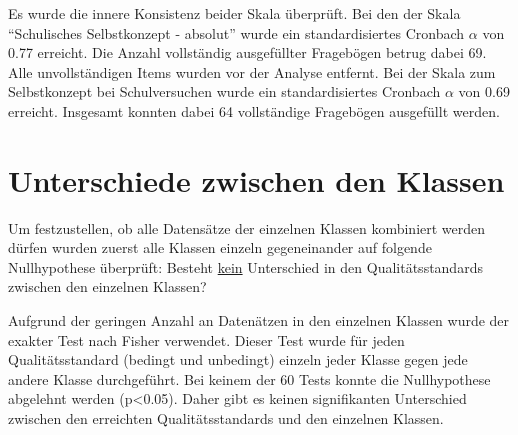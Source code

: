 Es wurde die innere Konsistenz beider Skala überprüft. Bei den der Skala "`Schulisches Selbstkonzept - absolut"' wurde ein standardisiertes Cronbach $\alpha$ von 0.77 erreicht. Die Anzahl vollständig ausgefüllter Fragebögen betrug dabei 69. Alle unvollständigen Items wurden vor der Analyse entfernt. Bei der Skala zum Selbstkonzept bei Schulversuchen wurde ein standardisiertes Cronbach $\alpha$ von 0.69 erreicht. Insgesamt konnten dabei 64 vollständige Fragebögen ausgefüllt werden. 


\section{Unterschiede zwischen den Klassen}

Um festzustellen, ob alle Datensätze der einzelnen Klassen kombiniert werden dürfen wurden zuerst alle Klassen einzeln gegeneinander auf folgende Nullhypothese überprüft: Besteht \underline{kein} Unterschied in den Qualitätsstandards zwischen den einzelnen Klassen?

Aufgrund der geringen Anzahl an Datenätzen in den einzelnen Klassen wurde der exakter Test nach Fisher verwendet. Dieser Test wurde für jeden Qualitätsstandard (bedingt und unbedingt) einzeln jeder Klasse gegen jede andere Klasse durchgeführt. Bei keinem der 60 Tests konnte die Nullhypothese abgelehnt werden (p<0.05). Daher gibt es keinen signifikanten Unterschied zwischen den erreichten Qualitätsstandards und den einzelnen Klassen.  





